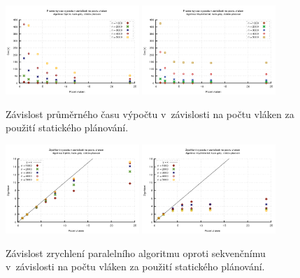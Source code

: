 \begin{figure}
    \centering
    \includegraphics[width=0.45\textwidth]{../grafy/02_openMP/02-01-Dijsktra_cas}
    \includegraphics[width=0.45\textwidth]{../grafy/02_openMP/02-01-Floyd_cas}
    \caption{Závislost průměrného času výpočtu v~závislosti na počtu vláken za použití statického plánování.}
    \label{f:mer:cas}
\end{figure}

\begin{figure}
    \centering
    \includegraphics[width=0.45\textwidth]{../grafy/02_openMP/02-02-Dijsktra_zrychleni}
    \includegraphics[width=0.45\textwidth]{../grafy/02_openMP/02-02-Floyd_zrychleni}
    \caption{Závislost zrychlení paralelního algoritmu oproti sekvenčnímu v~závislosti na počtu vláken za použití statického plánování.}
    \label{f:mer:zry}
\end{figure}

